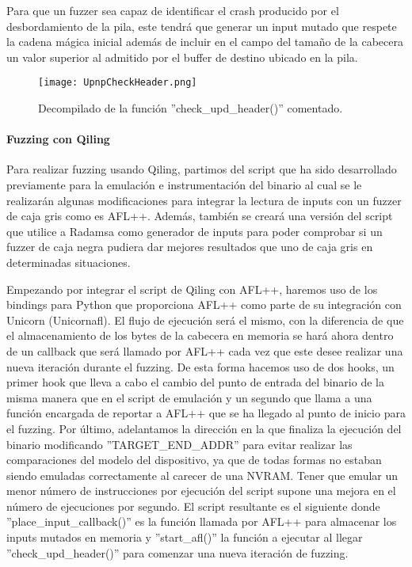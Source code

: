 Para que un fuzzer sea capaz de identificar el crash producido por el desbordamiento de la pila, este tendrá que generar un input mutado que respete la 
cadena mágica inicial además de incluir en el campo del tamaño de la cabecera un valor superior al admitido por el buffer de destino ubicado en la pila.

\begin{figure}[H]
    \centering
    \texttt{[image: UpnpCheckHeader.png]}
    \caption{Decompilado de la función ''check\_upd\_header()'' comentado.}
    \label{fig:UpnpCheckHeader}
\end{figure}

\paragraph{Fuzzing con Qiling}
Para realizar fuzzing usando Qiling, partimos del script que ha sido desarrollado previamente para la emulación e instrumentación del binario al
cual se le realizarán algunas modificaciones para integrar la lectura de inputs con un fuzzer de caja gris como es AFL++\cite{afl++}. Además, también se 
creará una versión del script que utilice a Radamsa\cite{radamsa} como generador de inputs para poder comprobar si un fuzzer de caja negra
pudiera dar mejores resultados que uno de caja gris en determinadas situaciones.\bigskip

Empezando por integrar el script de Qiling con AFL++, haremos uso de los bindings para Python que proporciona AFL++ como parte de su integración
con Unicorn (Unicornafl). El flujo de ejecución será el mismo, con la diferencia de que el almacenamiento de los bytes de la cabecera en memoria se hará ahora 
dentro de un callback que será llamado por AFL++ cada vez que este desee realizar una nueva iteración durante el fuzzing. De esta forma hacemos
uso de dos hooks, un primer hook que lleva a cabo el cambio del punto de entrada del binario de la misma manera que en el script de emulación y un 
segundo que llama a una función encargada de reportar a AFL++ que se ha llegado al punto de inicio para el fuzzing. Por último, adelantamos la 
dirección en la que finaliza la ejecución del binario modificando ''TARGET\_END\_ADDR'' para evitar realizar las comparaciones del modelo del 
dispositivo, ya que de todas formas no estaban siendo emuladas correctamente al carecer de una NVRAM. Tener que emular un menor número de 
instrucciones por ejecución del script supone una mejora en el número de ejecuciones por segundo. El script resultante es el siguiente donde 
''place\_input\_callback()'' es la función llamada por AFL++ para almacenar los inputs mutados en memoria y ''start\_afl()'' la función a ejecutar 
al llegar ''check\_upd\_header()'' para comenzar una nueva iteración de fuzzing.

